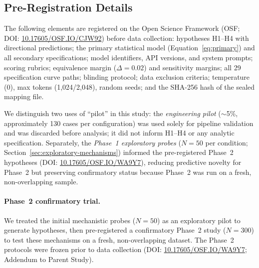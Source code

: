 \documentclass[preprint]{article}
\begin{document}
\subsection{Pre-Registration Details}

\begin{sloppypar}
The following elements are registered on the Open Science Framework (OSF; DOI: \href{https://doi.org/10.17605/OSF.IO/CJW92}{10.17605/OSF.IO/CJW92}) before data collection: hypotheses H1--H4 with directional predictions; the primary statistical model (Equation~\ref{eq:primary}) and all secondary specifications; model identifiers, API versions, and system prompts; scoring rubrics; equivalence margin ($\Delta = 0.02$) and sensitivity margins; all 29 specification curve paths; blinding protocol; data exclusion criteria; temperature (0), max tokens (1,024/2,048), random seeds; and the SHA-256 hash of the sealed mapping file.
\end{sloppypar}

\begin{sloppypar}
We distinguish two uses of ``pilot'' in this study: the \emph{engineering pilot} (${\sim}$5\%, approximately 130 cases per configuration) was used solely for pipeline validation and was discarded before analysis; it did not inform H1--H4 or any analytic specification.  Separately, the \emph{Phase~1 exploratory probes} ($N = 50$ per condition; Section~\ref{sec:exploratory-mechanisms}) informed the pre-registered Phase~2 hypotheses (DOI: \href{https://doi.org/10.17605/OSF.IO/WA9Y7}{10.17605/OSF.IO/WA9Y7}), reducing predictive novelty for Phase~2 but preserving confirmatory status because Phase~2 was run on a fresh, non-overlapping sample.
\end{sloppypar}

\paragraph{Phase~2 confirmatory trial.}
We treated the initial mechanistic probes ($N = 50$) as an exploratory pilot to generate hypotheses, then pre-registered a confirmatory Phase~2 study ($N = 300$) to test these mechanisms on a fresh, non-overlapping dataset. The Phase~2 protocols were frozen prior to data collection (DOI: \href{https://doi.org/10.17605/OSF.IO/WA9Y7}{10.17605/OSF.IO/WA9Y7}; Addendum to Parent Study).



\end{document}
